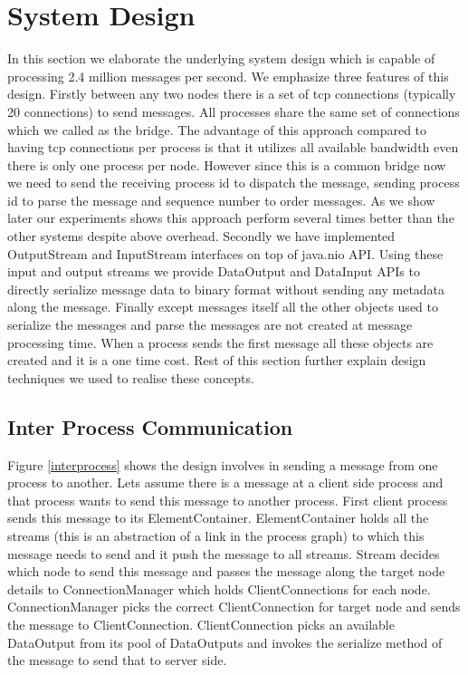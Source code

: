 \section{System Design}
In this section we elaborate the underlying system design which is capable of processing 2.4 million messages per second. We emphasize three features of this design. Firstly between any two nodes there is a set of tcp connections (typically 20 connections)  to send messages. All processes share the same set of connections which we called as the bridge. The advantage of this approach compared to having tcp connections per process is that it utilizes all available bandwidth even there is only one process per node. However since this is a common bridge now we need to send the receiving process id to dispatch the message, sending  process id to parse the message and sequence number to order messages. As we show later our experiments shows this approach perform several times better than the other systems despite above overhead. Secondly we have implemented OutputStream and InputStream interfaces on top of java.nio API. Using these input and output streams we provide DataOutput and DataInput APIs to directly serialize message data to binary format without sending any metadata along the message. Finally except messages itself all the other objects used to serialize the messages and parse the messages are not created at message processing time. When a process sends the first message all these objects are created and it is a one time cost. Rest of this section further explain design techniques we used to realise these concepts.
\subsection{Inter Process Communication}
Figure \ref{interprocess} shows the design involves in sending a message from one process to another. Lets assume there is a message at a client side process and that process wants to send this message to another process. First client process sends this message to its ElementContainer. ElementContainer holds all the streams (this is an abstraction of a link in the process graph) to which this message needs to send and it push the message to all streams. Stream decides which node to send this message and passes the message along the target node details to ConnectionManager which holds ClientConnections for each node. ConnectionManager picks the correct ClientConnection for target node and sends the message to ClientConnection. ClientConnection picks an available DataOutput from its pool of DataOutputs and invokes the serialize method of the message to send that to server side.

